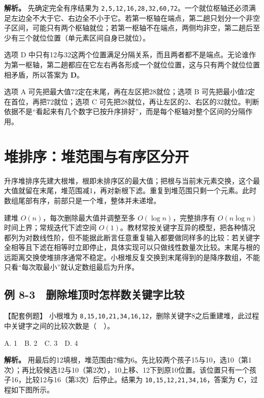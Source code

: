 \textbf{解析。} 先确定完全有序结果为 \texttt{2,\allowbreak{}5,\allowbreak{}12,\allowbreak{}16,\allowbreak{}28,\allowbreak{}32,\allowbreak{}60,\allowbreak{}72}。一个就位枢轴还必须满足左边全不大于它、右边全不小于它。若第一枢轴在端点，第二趟只划分一个非空子区间，可能只有两个枢轴就位；若第一枢轴不在端点，两侧均非空，第二趟后至少有三个就位位置（单元素区间自身已就位）。

选项 D 中只有12与32这两个位置满足分隔关系，而且两者都不是端点。无论谁作为第一枢轴，第二趟都应在它左右再各形成一个就位位置，这与只有两个就位位置相矛盾，所以答案为 \textbf{D}。

选项 A 可先把最大值72定在末尾，再在左区把28就位；选项 B 可先把最小值2定在首位，再把72就位；选项 C 可先把28就位，再让左区的2、右区的32就位。判断依据不是``看起来有几个数字已按升序排好''，而是每个枢轴对整个区间的分隔作用。

\section{堆排序：堆范围与有序区分开}\label{DS08-07}

升序堆排序先建大根堆，根即未排序区的最大值；把根与当前末元素交换，这个最大值就留在末尾，堆范围减1，再对新根下滤。重复到堆范围只剩一个元素。此时数组尾部有序，前部只是一个堆，整体并未递增。

建堆 \(O(n)\)，每次删除最大值并调整至多 \(O(\log n)\)，完整排序有 \(O(n\log n)\) 时间上界；常规迭代下滤空间 \(O(1)\)。教材常按关键字互异的模型，把各种情况都列为对数线性阶，但不能据此断言任意重复输入都要做同样多的比较：若关键字全相等且下滤在相等时立即停止，具体实现可以只做线性数量次比较。末尾与根的远距离交换使堆排序通常不稳定。小根堆反复交换到末尾得到的是降序数组，不能只看``每次取最小''就认定数组最后为升序。

\subsection{例 8-3　删除堆顶时怎样数关键字比较}\label{DS08-ex3}

\begin{example}[配套案例]

【配套例题】 小根堆为 \texttt{8,\allowbreak{}15,\allowbreak{}10,\allowbreak{}21,\allowbreak{}34,\allowbreak{}16,\allowbreak{}12}，删除关键字8之后重建堆，此过程中关键字之间的比较次数是（　）。

A. 1　B. 2　C. 3　D. 4

\end{example}

\textbf{解析。} 用最后的12填根，堆范围由7缩为6。先比较两个孩子15与10，选10（第1次）；再比较候选12与10（第2次），10上移、12下到原10位置。该位置只有一个孩子16，比较12与16（第3次）后停止。结果为 \texttt{10,\allowbreak{}15,\allowbreak{}12,\allowbreak{}21,\allowbreak{}34,\allowbreak{}16}，答案为 \textbf{C}，过程如下图所示。

